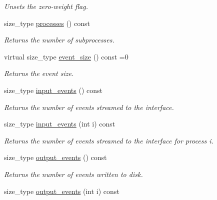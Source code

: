 \begin{DoxyCompactItemize}
\begin{DoxyCompactList}\small\item\em Unsets the zero-\/weight flag. \end{DoxyCompactList}\item 
\hypertarget{a00317_ae6db905736d66092b9dcf8120c6e935e}{}size\+\_\+type \hyperlink{a00317_ae6db905736d66092b9dcf8120c6e935e}{processes} () const \label{a00317_ae6db905736d66092b9dcf8120c6e935e}

\begin{DoxyCompactList}\small\item\em Returns the number of subprocesses. \end{DoxyCompactList}\item 
\hypertarget{a00317_ac6c0df9fb86662d54e3b4f903a8eb831}{}virtual size\+\_\+type \hyperlink{a00317_ac6c0df9fb86662d54e3b4f903a8eb831}{event\+\_\+size} () const =0\label{a00317_ac6c0df9fb86662d54e3b4f903a8eb831}

\begin{DoxyCompactList}\small\item\em Returns the event size. \end{DoxyCompactList}\item 
\hypertarget{a00317_a83647b85147e31455f2781ad3111849e}{}size\+\_\+type \hyperlink{a00317_a83647b85147e31455f2781ad3111849e}{input\+\_\+events} () const \label{a00317_a83647b85147e31455f2781ad3111849e}

\begin{DoxyCompactList}\small\item\em Returns the number of events streamed to the interface. \end{DoxyCompactList}\item 
\hypertarget{a00317_a4be24bd2d607368c9bb95282e3d7613a}{}size\+\_\+type \hyperlink{a00317_a4be24bd2d607368c9bb95282e3d7613a}{input\+\_\+events} (int i) const \label{a00317_a4be24bd2d607368c9bb95282e3d7613a}

\begin{DoxyCompactList}\small\item\em Returns the number of events streamed to the interface for process i. \end{DoxyCompactList}\item 
\hypertarget{a00317_a3c75abe5cfc8dc7fe822006dfd860dc2}{}size\+\_\+type \hyperlink{a00317_a3c75abe5cfc8dc7fe822006dfd860dc2}{output\+\_\+events} () const \label{a00317_a3c75abe5cfc8dc7fe822006dfd860dc2}

\begin{DoxyCompactList}\small\item\em Returns the number of events written to disk. \end{DoxyCompactList}\item 
\hypertarget{a00317_a61c0d694fb6f316c47c4d4aa33c4a452}{}size\+\_\+type \hyperlink{a00317_a61c0d694fb6f316c47c4d4aa33c4a452}{output\+\_\+events} (int i) const \label{a00317_a61c0d694fb6f316c47c4d4aa33c4a452}


\end{DoxyCompactItemize}

